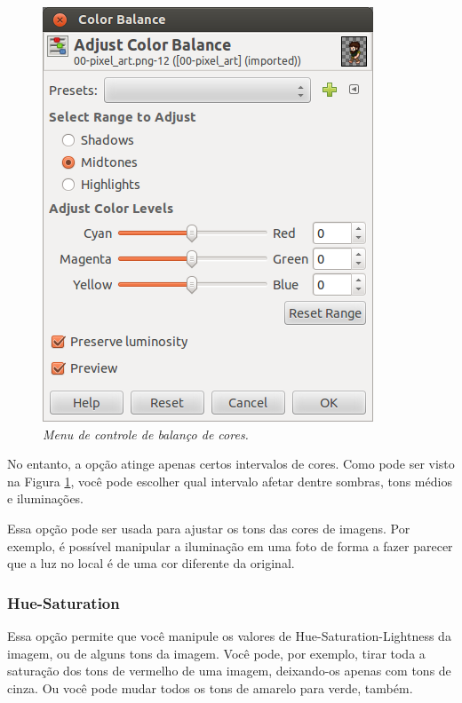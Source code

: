 \documentclass[12pt,onecolumn]{article}
\begin{document}
        \begin{figure}[H]
          \centering
          \includegraphics[width=.6\linewidth]{screenshots/08-color_balance.png}
          \caption{
            \footnotesize
            \it
            Menu de controle de balanço de cores.
          }
          \label{fig:color_balance}
        \end{figure}
        
        No entanto, a opção atinge apenas certos intervalos de cores. Como pode
        ser visto na Figura \ref{fig:color_balance}, você pode escolher qual
        intervalo afetar dentre sombras, tons médios e iluminações.
        
        Essa opção pode ser usada para ajustar os tons das cores de imagens. Por
        exemplo, é possível manipular a iluminação em uma foto de forma a fazer
        parecer que a luz no local é de uma cor diferente da original.
      
      \subsubsection{Hue-Saturation}
        Essa opção permite que você manipule os valores de
        Hue-Saturation-Lightness da imagem, ou de alguns tons da imagem. Você
        pode, por exemplo, tirar toda a saturação dos tons de vermelho de uma
        imagem, deixando-os apenas com tons de cinza. Ou você pode mudar todos
        os tons de amarelo para verde, também.
        
\end{document}
